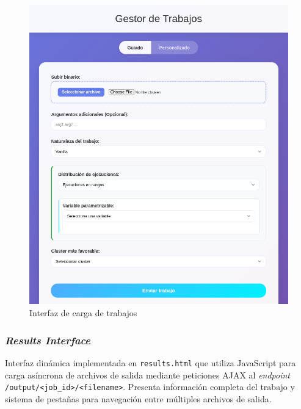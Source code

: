 \begin{figure}[H]
	\centering
	\includegraphics[scale=0.5]{tablas-images/pmv/upload-ui-screenshot.png}
	\caption{Interfaz de carga de trabajos}
	\label{fig:uiCargasTrabajos}
\end{figure}

\subsubsection{\textit{Results Interface}}
\noindent
Interfaz dinámica implementada en \texttt{results.html} que utiliza JavaScript para carga asíncrona de archivos de salida mediante peticiones AJAX al \textit{endpoint} \texttt{/output/<job\_id>/<filename>}. Presenta información completa del trabajo y sistema de pestañas para navegación entre múltiples archivos de salida.

